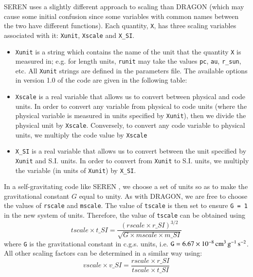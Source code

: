 \documentclass[a4paper]{article}
\newcommand{\NAME}{SEREN }
\newcommand{\var}[1]{\texttt{#1}}
\begin{document}
\NAME uses a slightly different approach to scaling than DRAGON 
(which may cause some initial confusion since some variables with common names 
between the two have different functions).  Each quantity, \var{X}, has 
three scaling variables associated with it: \var{Xunit}, \var{Xscale} 
and \var{X\_SI}.  



\begin{itemize}
\item \var{Xunit} is a string which contains the name of the unit that 
the quantity \var{X} is measured in; e.g. for length units, \var{runit} 
may take the values \var{pc}, \var{au}, \var{r\_sun}, etc.   
All \var{Xunit} strings are defined in the parameters file.  
The available options in version 1.0 of the code are given in 
the following table: 

\item \var{Xscale} is a real variable that allows us to convert 
between physical and code units.  In order to convert any variable 
from physical to code units (where the physical variable is measured 
in units specified by \var{Xunit}), then we divide the physical unit 
by \var{Xscale}.  Conversely, to convert any code variable to 
physical units, we multiply the code value by \var{Xscale}
\item \var{X\_SI} is a real variable that allows us to convert between 
the unit specified by \var{Xunit} and S.I. units.  In order to convert 
from \var{Xunit} to S.I. units, we multiply the variable 
(in units of \var{Xunit}) by \var{X\_SI}.
\end{itemize}


In a self-gravitating code like \NAME, we choose a set of units so as 
to make the gravitational constant $G$ equal to unity.  
As with DRAGON, we are free to choose the 
values of \var{rscale} and \var{mscale}.  The value of \var{tscale} is 
then set to ensure \var{G = 1} in the new system of units.  Therefore, 
the value of \var{tscale} can be obtained using 
\begin{equation}
tscale \times t\_SI = \frac{\left( rscale \times r\_SI \right)^{3/2}} 
{\sqrt{G \times mscale \times m\_SI}}
\end{equation}
where \var{G} is the gravitational constant in c.g.s. units, i.e. 
$\var{G} = 6.67 \times 10^{-8} \, {\rm cm}^3\,{\rm g}^{-1}\,{\rm s}^{-2}$. 
All other scaling factors can be determined in a similar way using: 
\begin{equation}
vscale \times v\_SI = \frac{rscale \times r\_SI} {tscale \times t\_SI}
\end{equation}
\end{document}
